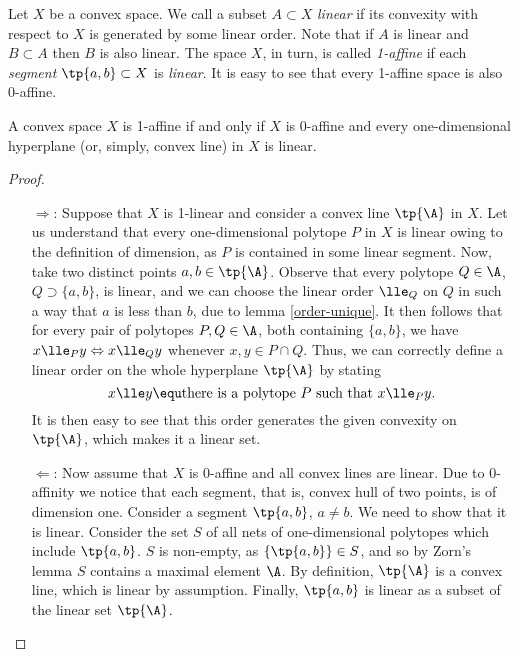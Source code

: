 \documentclass[12pt, a4paper]{article}
\begin{document}
\begin{definition}\label{def-1-affine}
    Let \(X\) be a convex space. We call a subset \(A \subset X\) \textit{linear} if its convexity with respect to \(X\) is generated by some linear order. Note that if \(A\) is linear and \(B \subset A\) then \(B\) is also linear. The space \(X\), in turn, is called \textit{1-affine} if each \textit{segment} \(\tp{a, b} \subset X\) is \textit{linear}. It is easy to see that every 1-affine space is also 0-affine.
\end{definition}

\begin{lemma}\label{0-1-affine}
    A convex space \(X\) is 1-affine if and only if \(X\) is 0-affine and every one-dimensional hyperplane (or, simply, convex line) in \(X\) is linear.
\end{lemma}
\begin{proof}~
    \begin{itemize}
        \item[\(\Longrightarrow\):] Suppose that \(X\) is 1-linear and consider a convex line \(\tp{\A}\) in \(X\). Let us understand that every one-dimensional polytope \(P\) in \(X\) is linear owing to the definition of dimension, as \(P\) is contained in some linear segment. Now, take two distinct points \(a, b \in \tp{\A}\). Observe that every polytope \(Q \in \A\), \(Q \supset \{a, b\}\), is linear, and we can choose the linear order \(\lle_Q\) on \(Q\) in such a way that \(a\) is less than \(b\), due to lemma \ref{order-unique}. It then follows that for every pair of polytopes \(P, Q \in \A\), both containing \(\{a, b\}\), we have \(x \lle_P y \Leftrightarrow x \lle_Q y\) whenever \(x, y \in P \cap Q\). Thus, we can correctly define a linear order on the whole hyperplane \(\tp{\A}\) by stating \[x \lle y \equ \mbox{there is a polytope } P \mbox{ such that } x \lle_P y.\] It is then easy to see that this order generates the given convexity on \(\tp{\A}\), which makes it a linear set.
        
        \item[\(\Longleftarrow\):] Now assume that \(X\) is 0-affine and all convex lines are linear. Due to 0-affinity we notice that each segment, that is, convex hull of two points, is of dimension one. Consider a segment \(\tp{a, b}\), \(a \ne b\). We need to show that it is linear. Consider the set \(S\) of all nets of one-dimensional polytopes which include \(\tp{a, b}\). \(S\) is non-empty, as \(\{\tp{a, b}\} \in S\), and so by Zorn's lemma \(S\) contains a maximal element \(\A\). By definition, \(\tp{\A}\) is a convex line, which is linear by assumption. Finally, \(\tp{a, b}\) is linear as a subset of the linear set \(\tp{\A}\).
    \end{itemize}
\end{proof}
\end{document}
